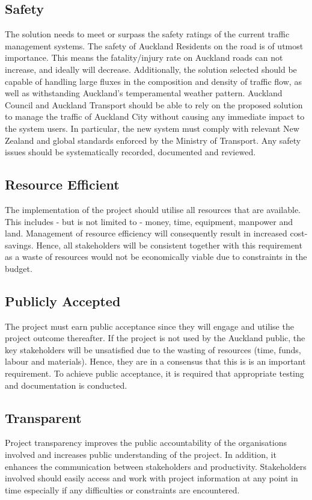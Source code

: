 \documentclass[twoside, a4paper, 11pt]{article}
\begin{document}
\subsection{Safety}
The solution needs to meet or surpass the safety ratings of the current traffic management systems. The safety of Auckland Residents on the road is of utmost importance. This means the fatality/injury rate on Auckland roads can not increase, and ideally will decrease. Additionally, the solution selected should be capable of handling large fluxes in the composition and density of traffic flow, as well as withstanding Auckland's temperamental weather pattern. Auckland Council and Auckland Transport should be able to rely on the proposed solution to manage the traffic of Auckland City without causing any immediate impact to the system users. In particular, the new system must comply with relevant New Zealand and global standards enforced by the Ministry of Transport. Any safety issues should be systematically recorded, documented and reviewed.

\subsection{Resource Efficient}
The implementation of the project should utilise all resources that are available. This includes - but is not limited to - money, time, equipment, manpower and land.  Management of resource efficiency will consequently result in increased cost-savings. Hence, all stakeholders will be consistent together with this requirement as a waste of resources would not be economically viable due to constraints in the budget.

\subsection{Publicly Accepted}
The project must earn public acceptance since they will engage and utilise the project outcome thereafter. If the project is not used by the Auckland public, the key stakeholders will be unsatisfied due to the wasting of resources (time, funds, labour and materials). Hence, they are in a consensus that this is is an important requirement. To achieve public acceptance, it is required that appropriate testing and documentation is conducted.

\subsection{Transparent}
Project transparency improves the public accountability of the organisations involved and increases public understanding of the project. In addition, it enhances the communication between stakeholders and productivity. Stakeholders involved should easily access and work with project information at any point in time especially if any difficulties or constraints are encountered.
\newpage
\end{document}
